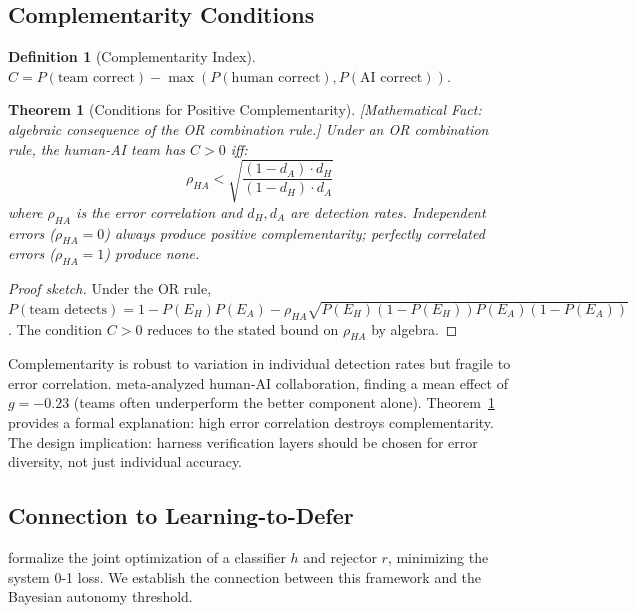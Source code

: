 \documentclass[11pt, a4paper]{googledeepmind}
\newtheorem{definition}{Definition}[section]
\newtheorem{theorem}{Theorem}[section]
\begin{document}
\subsection{Complementarity Conditions}

\begin{definition}[Complementarity Index]
$C = P(\text{team correct}) - \max(P(\text{human correct}), P(\text{AI correct}))$.
\end{definition}

\begin{theorem}[Conditions for Positive Complementarity]
\emph{[Mathematical Fact: algebraic consequence of the OR combination rule.]}
\label{thm:complementarity}
Under an OR combination rule, the human-AI team has $C > 0$ iff:
\begin{equation}
\rho_{HA} < \sqrt{\frac{(1 - d_A) \cdot d_H}{(1 - d_H) \cdot d_A}}
\end{equation}
where $\rho_{HA}$ is the error correlation and $d_H, d_A$ are detection rates. Independent errors ($\rho_{HA} = 0$) always produce positive complementarity; perfectly correlated errors ($\rho_{HA} = 1$) produce none.
\end{theorem}

\begin{proof}[Proof sketch]
Under the OR rule, $P(\text{team detects}) = 1 - P(E_H)P(E_A) - \rho_{HA}\sqrt{P(E_H)(1-P(E_H))P(E_A)(1-P(E_A))}$. The condition $C > 0$ reduces to the stated bound on $\rho_{HA}$ by algebra.
\end{proof}

Complementarity is robust to variation in individual detection rates but fragile to error correlation. \citet{vaccaro2024combinations} meta-analyzed human-AI collaboration, finding a mean effect of $g = -0.23$ (teams often underperform the better component alone). Theorem~\ref{thm:complementarity} provides a formal explanation: high error correlation destroys complementarity. The design implication: harness verification layers should be chosen for error diversity, not just individual accuracy.

\subsection{Connection to Learning-to-Defer}

\citet{mozannar2020consistent} formalize the joint optimization of a classifier $h$ and rejector $r$, minimizing the system 0-1 loss. We establish the connection between this framework and the Bayesian autonomy threshold.
\end{document}
